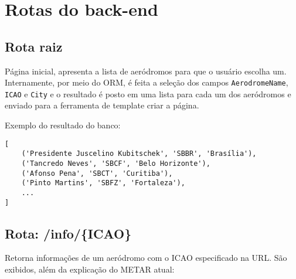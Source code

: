 \chapter{Rotas do back-end}

\section{Rota raiz}

Página inicial, apresenta a lista de aeródromos para que o usuário escolha um. 
Internamente, por meio do ORM, é feita a seleção dos campos \texttt{AerodromeName},
\texttt{ICAO} e \texttt{City} e o resultado é posto em uma lista para cada um dos aeródromos e enviado
para a ferramenta de template criar a página.

Exemplo do resultado do banco:
\begin{verbatim}
[
    ('Presidente Juscelino Kubitschek', 'SBBR', 'Brasília'), 
    ('Tancredo Neves', 'SBCF', 'Belo Horizonte'), 
    ('Afonso Pena', 'SBCT', 'Curitiba'), 
    ('Pinto Martins', 'SBFZ', 'Fortaleza'), 
    ...
]
\end{verbatim}

\section{Rota: /info/\{ICAO\}}

Retorna informações de um aeródromo com o ICAO especificado na URL. São exibidos,
além da explicação do METAR atual:


